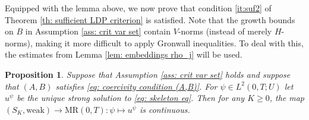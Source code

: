 \documentclass{amsart}
\renewcommand{\MR}{\mathrm{MR}}
\newcommand{\<}{\langle}
\newcommand{\?}{\rangle}
\theoremstyle{plain}
\theoremstyle{remark}
\theoremstyle{plain}
\newtheorem{proposition}[theorem]{Proposition}
\numberwithin{equation}{section}
\begin{document}
Equipped with the lemma above, we now prove that condition \ref{it:suf2} of Theorem \ref{th: sufficient LDP criterion} is satisfied.
Note that the growth bounds on $B$ in Assumption \ref{ass: crit var set} contain $V$-norms (instead of merely $H$-norms), making it more difficult to apply Gronwall inequalities. To deal with this, the estimates from Lemma \ref{lem: embeddings rho_j} will be used.

\begin{proposition}\label{prop:cpt sublevel sets}
Suppose that Assumption \ref{ass: crit var set} holds and suppose that $(A,B)$ satisfies \eqref{eq: coercivity condition (A,B)}.
For $\psi\in L^2(0,T;U)$ let $u^\psi$ be the unique strong solution to \eqref{eq: skeleton eq}.
Then for any $K\geq 0$, the map $(S_K,\mathrm{weak})\to \MR(0,T)\colon  \psi\mapsto u^{\psi}$
is continuous.
\end{proposition}
\end{document}
